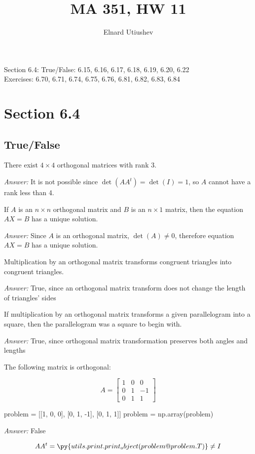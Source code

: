 \documentclass[letterpaper]{article}
\title{MA 351, HW 11}
\author{Elnard Utiushev}
\newcommand{\ans}{\textit{Answer: }}
\newenvironment{question}[2][Question]{\begin{trivlist}
\item[\hskip \labelsep {\bfseries #1}\hskip \labelsep {\bfseries #2.}]}{\end{trivlist}}
\newcommand{\printobj}[1]{\py{utils.print.print_object(#1)}}
\begin{document}
\maketitle

Section 6.4: True/False: 6.15, 6.16, 6.17, 6.18, 6.19, 6.20, 6.22 \\
Exercises: 6.70, 6.71, 6.74, 6.75, 6.76, 6.81, 6.82, 6.83, 6.84

\section{Section 6.4}
\subsection{True/False}

\begin{question}{6.15}
  There exist $4 \times 4$ orthogonal matrices with rank 3.

  \ans It is not possible since $\det(AA^t) = \det(I) = 1$, so $A$ cannot 
  have a rank less than 4.
\end{question}

\begin{question}{6.16}
  If $A$ is an $n \times n$ orthogonal matrix and $B$ is an $n \times 1$ matrix, then the equation
  $A X=B$ has a unique solution.

  \ans Since $A$ is an orthogonal matrix, $\det(A) \neq 0$, therefore equation
  $A X=B$ has a unique solution.
\end{question}

\begin{question}{6.17}
  Multiplication by an orthogonal matrix transforms congruent triangles into
  congruent triangles.

  \ans True, since an orthogonal matrix transform does not change the length 
  of triangles' sides
\end{question}

\begin{question}{6.18}
  If multiplication by an orthogonal matrix transforms a given parallelogram into
  a square, then the parallelogram was a square to begin with.

  \ans True, since orthogonal matrix transformation preserves both angles and lengths
\end{question}

\begin{question}{6.19}
  The following matrix is orthogonal:

  $$
  A = \left[ \begin{array}{rrr}{1} & {0} & {0} \\ {0} & {1} & {-1} \\ {0} & {1} & {1}\end{array}\right]
  $$

  \begin{pycode}
problem = [[1, 0, 0], [0, 1, -1], [0, 1, 1]]
problem = np.array(problem)
  \end{pycode}

  \ans False

  $$A A^t = \printobj{problem @ problem.T} \neq I$$

\end{question}
\end{document}
